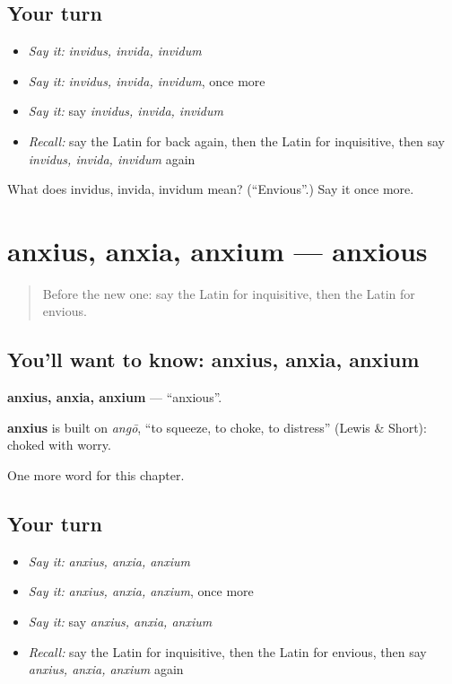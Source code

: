 \subsection*{Your turn}
\begin{itemize}
\raggedright
  \item \emph{Say it:} \emph{invidus, invida, invidum}
  \item \emph{Say it:} \emph{invidus, invida, invidum}, once more
  \item \emph{Say it:} say \emph{invidus, invida, invidum}
  \item \emph{Recall:} say the Latin for back again, then the Latin for inquisitive, then say \emph{invidus, invida, invidum} again
\end{itemize}

\begin{tcolorbox}[breakable,colback=teal!4,colframe=teal!35!black,title={Before you move on}]
What does invidus, invida, invidum mean? (\textquotedblleft{}Envious\textquotedblright{}.) Say it once more.
\end{tcolorbox}
\section[anxius, anxia, anxium]{anxius, anxia, anxium — anxious}

\label{lesson:LA-C212-anxius}



\begin{quote}
Before the new one: say the Latin for inquisitive, then the Latin for envious.
\end{quote}

\subsection*{You'll want to know: anxius, anxia, anxium}
\textbf{anxius, anxia, anxium} — \textquotedblleft{}anxious\textquotedblright{}.

\begin{cousinweb}
\textbf{anxius} is built on \emph{angō}, \textquotedblleft{}to squeeze, to choke, to distress\textquotedblright{} (Lewis \& Short): choked with worry.
\end{cousinweb}

\begin{grammarlens}[title={What you've built}]
One more word for this chapter.
\end{grammarlens}

\subsection*{Your turn}
\begin{itemize}
\raggedright
  \item \emph{Say it:} \emph{anxius, anxia, anxium}
  \item \emph{Say it:} \emph{anxius, anxia, anxium}, once more
  \item \emph{Say it:} say \emph{anxius, anxia, anxium}
  \item \emph{Recall:} say the Latin for inquisitive, then the Latin for envious, then say \emph{anxius, anxia, anxium} again
\end{itemize}

